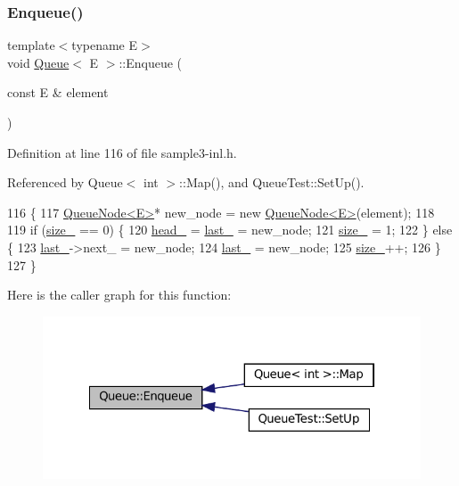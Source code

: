 \subsubsection{\texorpdfstring{Enqueue()}{Enqueue()}}
{\footnotesize\ttfamily template$<$typename E$>$ \\
void \hyperlink{classQueue}{Queue}$<$ E $>$\+::Enqueue (\begin{DoxyParamCaption}\item[{const E \&}]{element }\end{DoxyParamCaption})\hspace{0.3cm}{\ttfamily [inline]}}



Definition at line 116 of file sample3-\/inl.\+h.



Referenced by Queue$<$ int $>$\+::\+Map(), and Queue\+Test\+::\+Set\+Up().


\begin{DoxyCode}
116                                  \{
117     \hyperlink{classQueueNode}{QueueNode<E>}* new\_node = \textcolor{keyword}{new} \hyperlink{classQueueNode}{QueueNode<E>}(element);
118 
119     \textcolor{keywordflow}{if} (\hyperlink{classQueue_a7ac3c0717d894e1aecc56f4ddb35c7ea}{size\_} == 0) \{
120       \hyperlink{classQueue_abf9219bcea800d26e8bfdb4777d98729}{head\_} = \hyperlink{classQueue_a7466dca4f96147c9124af582ab170df0}{last\_} = new\_node;
121       \hyperlink{classQueue_a7ac3c0717d894e1aecc56f4ddb35c7ea}{size\_} = 1;
122     \} \textcolor{keywordflow}{else} \{
123       \hyperlink{classQueue_a7466dca4f96147c9124af582ab170df0}{last\_}->next\_ = new\_node;
124       \hyperlink{classQueue_a7466dca4f96147c9124af582ab170df0}{last\_} = new\_node;
125       \hyperlink{classQueue_a7ac3c0717d894e1aecc56f4ddb35c7ea}{size\_}++;
126     \}
127   \}
\end{DoxyCode}
Here is the caller graph for this function\+:
\nopagebreak
\begin{figure}[H]
\begin{center}
\leavevmode
\includegraphics[width=322pt]{classQueue_abaa2e7175457307bca74f5562cbdaaa9_icgraph}
\end{center}
\end{figure}
\mbox{\label{classQueue_a71aa0154ef75bb87a53b6af1829fcd5e}} 
